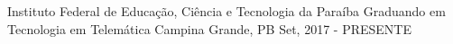 
\begin{cventries}
  \cventry
    {Instituto Federal de Educação, Ciência e Tecnologia da Paraíba} %
    {Graduando em Tecnologia em Telemática} %
    {Campina Grande, PB} %
    {Set, 2017 - PRESENTE} %
    {}
\end{cventries}

